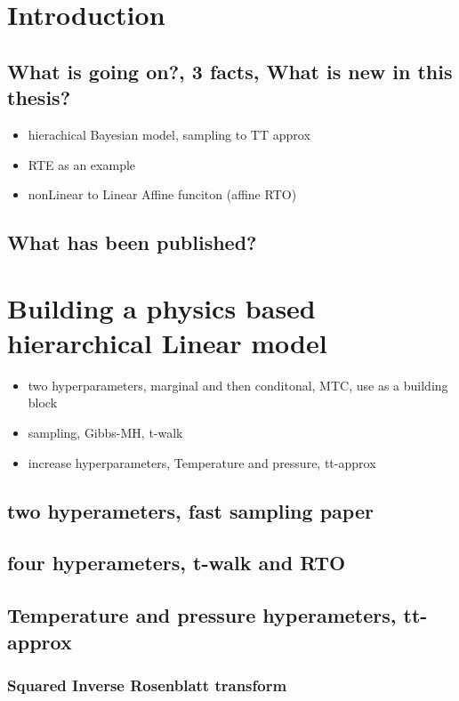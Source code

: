 \chapter{Introduction}

\section{What is going on?, 3 facts, What is new in this thesis?}
\begin{itemize}
	\item hierachical Bayesian model, sampling to TT approx
	\item RTE as an example
	\item nonLinear to Linear Affine funciton (affine RTO)
\end{itemize}
\section{What has been published?}

\chapter{Building a physics based hierarchical Linear model}
\begin{itemize}
	\item two hyperparameters, marginal and then conditonal, MTC, use as a building block
	\item  sampling, Gibbs-MH, t-walk
	\item increase hyperparameters, Temperature and pressure, tt-approx
\end{itemize}

\section{two hyperameters, fast sampling paper}

\section{four hyperameters, t-walk and RTO}

\section{Temperature and pressure hyperameters, tt-approx}
\subsection{Squared Inverse Rosenblatt transform}


